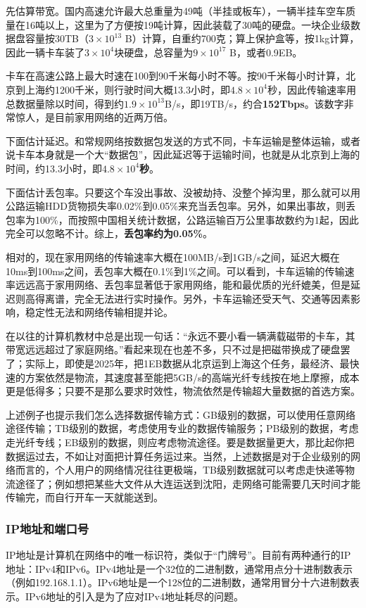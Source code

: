 \begin{answer}
  先估算带宽。国内高速允许最大总重量为49吨（半挂或板车），一辆半挂车空车质量在16吨以上，这里为了方便按19吨计算，因此装载了30吨的硬盘。一块企业级数据盘容量按30TB（$3\times 10^{13}$ B）计算，自重约700克；算上保护盒等，按1kg计算，因此一辆卡车装了$3\times 10^4$块硬盘，总容量为$9\times 10^{17}$ B，或者0.9EB。

  卡车在高速公路上最大时速在100到90千米每小时不等。按90千米每小时计算，北京到上海约1200千米，则行驶时间大概13.3小时，即$4.8\times 10^4$秒，因此传输速率用总数据量除以时间，得到约$1.9\times 10^{13}$B/s，即19TB/s，约合\textbf{152Tbps}。该数字非常惊人，是目前家用网络的近两万倍。

  下面估计延迟。和常规网络按数据包发送的方式不同，卡车运输是整体运输，或者说卡车本身就是一个大“数据包”，因此延迟等于运输时间，也就是从北京到上海的时间，约13.3小时，即\textbf{$4.8\times 10^4$秒}。

  下面估计丢包率。只要这个车没出事故、没被劫持、没整个掉沟里，那么就可以用公路运输HDD货物损失率0.02\%到0.05\%来充当丢包率。另外，如果出事故，则丢包率为100\%，而按照中国相关统计数据，公路运输百万公里事故数约为1起，因此完全可以忽略不计。综上，\textbf{丢包率约为0.05\%}。

  相对的，现在家用网络的传输速率大概在100MB/s到1GB/s之间，延迟大概在10ms到100ms之间，丢包率大概在0.1\%到1\%之间。可以看到，卡车运输的传输速率远远高于家用网络、丢包率显著低于家用网络，能和最优质的光纤媲美，但是延迟则高得离谱，完全无法进行实时操作。另外，卡车运输还受天气、交通等因素影响，稳定性无法和网络传输相提并论。
\end{answer}

在以往的计算机教材中总是出现一句话：“永远不要小看一辆满载磁带的卡车，其带宽远远超过了家庭网络。”看起来现在也差不多，只不过是把磁带换成了硬盘罢了；实际上，即使是2025年，把1EB数据从北京运到上海这个任务，最经济、最快速的方案依然是物流，其速度甚至能把5GB/s的高端光纤专线按在地上摩擦，成本更是低得多；只要不是那么要求时效性，物流依然是传输超大量数据的首选方案。

上述例子也提示我们怎么选择数据传输方式：GB级别的数据，可以使用任意网络途径传输；TB级别的数据，考虑使用专业的数据传输服务；PB级别的数据，考虑走光纤专线；EB级别的数据，则应考虑物流途径。要是数据量更大，那比起你把数据运过去，不如让对面把计算任务运过来。当然，上述数据是对于企业级别的网络而言的，个人用户的网络情况往往更极端，TB级别数据就可以考虑走快递等物流途径了；例如想把某些大文件从大连运送到沈阳，走网络可能需要几天时间才能传输完，而自行开车一天就能送到。

\subsubsection{IP地址和端口号}
IP地址是计算机在网络中的唯一标识符，类似于“门牌号”。目前有两种通行的IP地址：IPv4和IPv6。IPv4地址是一个32位的二进制数，通常用点分十进制数表示（例如192.168.1.1）。IPv6地址是一个128位的二进制数，通常用冒分十六进制数表示。IPv6地址的引入是为了应对IPv4地址耗尽的问题。

